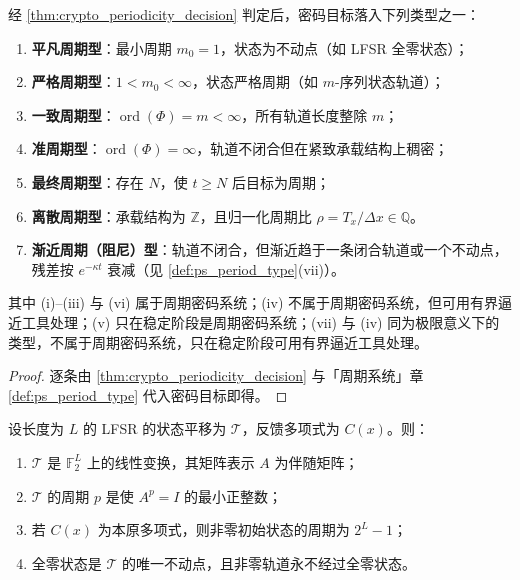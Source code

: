 \begin{corollary}[密码周期类型]\label{cor:crypto_period_type}
经 \cref{thm:crypto_periodicity_decision} 判定后，密码目标落入下列类型之一：
\begin{enumerate}[label=(\roman*)]
    \item \textbf{平凡周期型}：最小周期 \(m_0=1\)，状态为不动点（如 LFSR 全零状态）；
    \item \textbf{严格周期型}：\(1<m_0<\infty\)，状态严格周期（如 \(m\)-序列状态轨道）；
    \item \textbf{一致周期型}：\(\operatorname{ord}(\Phi)=m<\infty\)，所有轨道长度整除 \(m\)；
    \item \textbf{准周期型}：\(\operatorname{ord}(\Phi)=\infty\)，轨道不闭合但在紧致承载结构上稠密；
    \item \textbf{最终周期型}：存在 \(N\)，使 \(t\ge N\) 后目标为周期；
    \item \textbf{离散周期型}：承载结构为 \(\mathbb Z\)，且归一化周期比 \(\rho=T_x/\Delta x\in\mathbb Q\)。
    \item \textbf{渐近周期（阻尼）型}：轨道不闭合，但渐近趋于一条闭合轨道或一个不动点，残差按 \(e^{-\kappa t}\) 衰减（见 \cref{def:ps_period_type}(vii)）。
\end{enumerate}
其中 (i)--(iii) 与 (vi) 属于周期密码系统；(iv) 不属于周期密码系统，但可用有界逼近工具处理；(v) 只在稳定阶段是周期密码系统；(vii) 与 (iv) 同为极限意义下的类型，不属于周期密码系统，只在稳定阶段可用有界逼近工具处理。
\end{corollary}

\begin{proof}
逐条由 \cref{thm:crypto_periodicity_decision} 与「周期系统」章 \cref{def:ps_period_type} 代入密码目标即得。
\end{proof}

\begin{lemma}\label{lem:lfsr_period}
设长度为 \(L\) 的 LFSR 的状态平移为 \(\mathcal T\)，反馈多项式为 \(C(x)\)。则：
\begin{enumerate}[label=(\roman*)]
    \item \(\mathcal T\) 是 \(\mathbb F_2^L\) 上的线性变换，其矩阵表示 \(A\) 为伴随矩阵；
    \item \(\mathcal T\) 的周期 \(p\) 是使 \(A^p=I\) 的最小正整数；
    \item 若 \(C(x)\) 为本原多项式，则非零初始状态的周期为 \(2^L-1\)；
    \item 全零状态是 \(\mathcal T\) 的唯一不动点，且非零轨道永不经过全零状态。
\end{enumerate}
\end{lemma}

